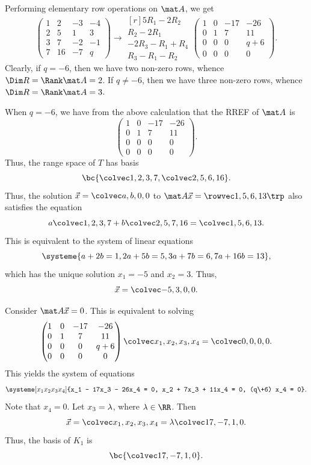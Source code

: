\begin{solution}
    \begin{ppart}
        Performing elementary row operations on $\mat A$, we get \[\begin{pmatrix}1 & 2 & -3 & -4 \\ 2 & 5 & 1 & 3 \\ 3 & 7 & -2 & -1 \\ 7 & 16 & -7 & q\end{pmatrix} \rightarrow \begin{matrix}[r] \scriptstyle 5R_1 - 2R_2 \\ \scriptstyle R_2 - 2R_1 \\ \scriptstyle -2R_3 - R_1 + R_4 \\ \scriptstyle R_3 - R_1 - R_2\end{matrix} \begin{pmatrix}1 & 0 & -17 & -26 \\ 0 & 1 & 7 & 11 \\ 0 & 0 & 0 & q+6 \\ 0 & 0 & 0 & 0\end{pmatrix}.\] Clearly, if $q = -6$, then we have two non-zero rows, whence $\Dim R = \Rank \mat A = 2$. If $q \neq -6$, then we have three non-zero rows, whence $\Dim R = \Rank \mat A = 3$.
    \end{ppart}
    \begin{ppart}
        When $q = -6$, we have from the above calculation that the RREF of $\mat A$ is \[\begin{pmatrix}1 & 0 & -17 & -26 \\ 0 & 1 & 7 & 11 \\ 0 & 0 & 0 & 0 \\ 0 & 0 & 0 & 0\end{pmatrix}.\] Thus, the range space of $T$ has basis \[\bc{\cveciv1237, \cveciv256{16}}.\] Thus, the solution $\vec x = \cveciv{a}{b}{0}{0}$ to $\mat A \vec x = \cvecivx156{13}$ also satisfies the equation \[a \cveciv1237 + b \cveciv257{16} = \cveciv156{13}.\] This is equivalent to the system of linear equations \[\systeme{a + 2b = 1, 2a + 5b = 5, 3a + 7b = 6, 7a + 16b = 13},\] which has the unique solution $x_1 = -5$ and $x_2 = 3$. Thus, \[\vec x = \cveciv{-5}{3}00.\]
    \end{ppart}
    \begin{ppart}
        Consider $\mat A \vec x = 0$. This is equivalent to solving \[\begin{pmatrix}1 & 0 & -17 & -26 \\ 0 & 1 & 7 & 11 \\ 0 & 0 & 0 & q+6 \\ 0 & 0 & 0 & 0\end{pmatrix} \cveciv{x_1}{x_2}{x_3}{x_4} = \cveciv0000.\] This yields the system of equations \[\systeme[x_1x_2x_3x_4]{x_1 - 17x_3 - 26x_4 = 0, x_2 + 7x_3 + 11x_4 = 0, (q\+6) x_4 = 0}.\] Note that $x_4 = 0$. Let $x_3 = \lambda$, where $\l \in \RR$. Then \[\vec x = \cveciv{x_1}{x_2}{x_3}{x_4} = \l\cveciv{17}{-7}{1}{0}.\] Thus, the basis of $K_1$ is \[\bc{\cveciv{17}{-7}{1}{0}}.\]

\end{ppart}
\end{solution}
